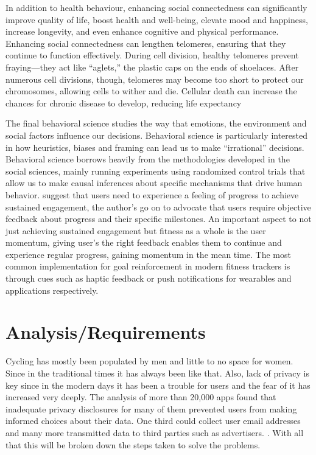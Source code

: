 \documentclass{l4proj}
\begin{document}
In addition to health behaviour, enhancing social connectedness can significantly improve quality of life, boost health and well-being, elevate mood and happiness, increase longevity, and even enhance cognitive and physical performance. Enhancing social connectedness can lengthen telomeres, ensuring that they continue to function effectively. During cell division, healthy telomeres prevent fraying—they act like “aglets,” the plastic caps on the ends of shoelaces. After numerous cell divisions, though, telomeres may become too short to protect our chromosomes, allowing cells to wither and die. Cellular death can increase the chances for chronic disease to develop, reducing life expectancy \cite{greider1996telomeres}

The final behavioral science studies the way that emotions, the environment and social factors influence our decisions. Behavioral science is particularly interested in how heuristics, biases and framing can lead us to make “irrational” decisions. Behavioral science borrows heavily from the methodologies developed in the social sciences, mainly running experiments using randomized control trials that allow us to make causal inferences about specific mechanisms that drive human behavior.\cite{wu2016fitness} suggest that users need to experience a feeling of progress to achieve sustained engagement, the author's go on to advocate that users require objective feedback about progress and their specific milestones. An important aspect to not just achieving sustained engagement but fitness as a whole is the user momentum, giving user's the right feedback enables them to continue and experience regular progress, gaining momentum in the mean time. The most common implementation for goal reinforcement in modern fitness trackers is through cues such as haptic feedback or push notifications for wearables and applications respectively. 




\chapter{Analysis/Requirements}


Cycling has mostly been populated by men and little to no space for women. Since in the traditional times it has always been like that. Also, lack of privacy is key since in the modern days it has been a trouble for users and the fear of it has increased  very deeply. The analysis of more than 20,000 apps found that inadequate privacy disclosures for many of them prevented users from making informed choices about their data. One third could collect user email addresses and many more transmitted data to third parties such as advertisers. \cite{mayer2012third}. With all that this will be broken down the steps taken to solve the problems. 
\end{document}
